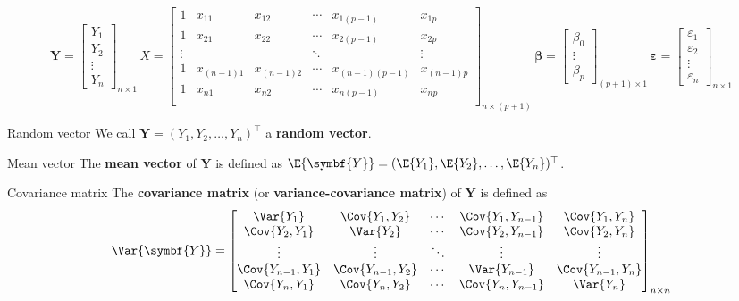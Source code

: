 \[ \symbf{Y}=\begin{bmatrix}
        Y_1    \\
        Y_2    \\
        \vdots \\
        Y_n
    \end{bmatrix}_{n\times 1}\,
    X=
    \begin{bmatrix}
        1      & x_{11}     & x_{12}     & \cdots & x_{1(p-1)}     & x_{1p}     \\
        1      & x_{21}     & x_{22}     & \cdots & x_{2(p-1)}     & x_{2p}     \\
        \vdots &            &            & \ddots &                & \vdots     \\
        1      & x_{(n-1)1} & x_{(n-1)2} & \cdots & x_{(n-1)(p-1)} & x_{(n-1)p} \\
        1      & x_{n1}     & x_{n2}     & \cdots & x_{n(p-1)}     & x_{n p}    \\
    \end{bmatrix}_{n\times(p+1)}\,
    \symbf{\beta}=
    \begin{bmatrix}
        \beta_0 \\
        \vdots  \\
        \beta_p
    \end{bmatrix}_{(p+1)\times 1}\,
    \symbf{\varepsilon}=\begin{bmatrix}
        \varepsilon_1 \\
        \varepsilon_2 \\
        \vdots        \\
        \varepsilon_n
    \end{bmatrix}_{n\times 1} \]
\begin{Definition}{Random vector}{}
    We call $ \symbf{Y}=(Y_1,Y_2,\ldots,Y_{n})^\top $
    a \textbf{random vector}.
\end{Definition}
\begin{Definition}{Mean vector}{}
    The \textbf{mean vector} of $ \symbf{Y} $ is defined as
    $ \E{\symbf{Y}}=(\E{Y_1},\E{Y_2},\ldots,\E{Y_n})^\top $.
\end{Definition}
\begin{Definition}{Covariance matrix}{}
    The \textbf{covariance matrix} (or \textbf{variance-covariance matrix}) of $ \symbf{Y} $ is defined as
    \[ \Var{\symbf{Y}}=\begin{bmatrix}
            \Var{Y_1}         & \Cov{Y_1,Y_2}     & \cdots & \Cov{Y_1,Y_{n-1}} & \Cov{Y_1,Y_n}     \\
            \Cov{Y_2,Y_1}     & \Var{Y_2}         & \cdots & \Cov{Y_2,Y_{n-1}} & \Cov{Y_2,Y_n}     \\
            \vdots            & \vdots            & \ddots & \vdots            & \vdots            \\
            \Cov{Y_{n-1},Y_1} & \Cov{Y_{n-1},Y_2} & \cdots & \Var{Y_{n-1}}     & \Cov{Y_{n-1},Y_n} \\
            \Cov{Y_n,Y_1}     & \Cov{Y_n,Y_2}     & \cdots & \Cov{Y_n,Y_{n-1}} & \Var{Y_n}
        \end{bmatrix}_{n\times n} \]
\end{Definition}
